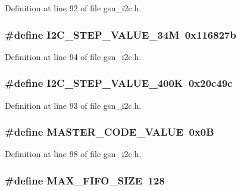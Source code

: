 Definition at line 92 of file gsn\_\-i2c.h.

\hypertarget{a00516_affce4a0cfddd2ddf661fe33b4b60cb67}{
\subsubsection[{I2C\_\-STEP\_\-VALUE\_\-34M}]{\setlength{\rightskip}{0pt plus 5cm}\#define I2C\_\-STEP\_\-VALUE\_\-34M~0x116827b}}
\label{a00516_affce4a0cfddd2ddf661fe33b4b60cb67}


Definition at line 94 of file gsn\_\-i2c.h.

\hypertarget{a00516_a3d3b7d87fcf2351f9db5d426e344a934}{
\subsubsection[{I2C\_\-STEP\_\-VALUE\_\-400K}]{\setlength{\rightskip}{0pt plus 5cm}\#define I2C\_\-STEP\_\-VALUE\_\-400K~0x20c49c}}
\label{a00516_a3d3b7d87fcf2351f9db5d426e344a934}


Definition at line 93 of file gsn\_\-i2c.h.

\hypertarget{a00516_affcc1dcbe50bbf9e262eb3fdd0ece3f4}{
\subsubsection[{MASTER\_\-CODE\_\-VALUE}]{\setlength{\rightskip}{0pt plus 5cm}\#define MASTER\_\-CODE\_\-VALUE~0x0B}}
\label{a00516_affcc1dcbe50bbf9e262eb3fdd0ece3f4}


Definition at line 98 of file gsn\_\-i2c.h.

\hypertarget{a00516_a70781c406c17458a408f41de8605edfd}{
\subsubsection[{MAX\_\-FIFO\_\-SIZE}]{\setlength{\rightskip}{0pt plus 5cm}\#define MAX\_\-FIFO\_\-SIZE~128}}
\label{a00516_a70781c406c17458a408f41de8605edfd}


